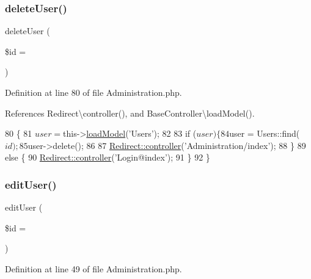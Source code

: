 \subsubsection{\texorpdfstring{delete\+User()}{deleteUser()}}
{\footnotesize\ttfamily delete\+User (\begin{DoxyParamCaption}\item[{}]{\$id = {\ttfamily \textquotesingle{}\textquotesingle{}} }\end{DoxyParamCaption})}



Definition at line 80 of file Administration.\+php.



References Redirect\textbackslash{}controller(), and Base\+Controller\textbackslash{}load\+Model().


\begin{DoxyCode}
80                                          \{
81         $user = $this->\hyperlink{class_base_controller_a5fa8890bd3a9d20f5c0cc2377dc49eb1}{loadModel}(\textcolor{stringliteral}{'Users'});
82 
83         \textcolor{keywordflow}{if} ($user) \{
84             $user = Users::find($id);
85             $user->delete();
86 
87             \hyperlink{class_redirect_ab7d0d268b6aaa9a5470b7cb8c7eb1b61}{Redirect::controller}(\textcolor{stringliteral}{'Administration/index'});
88         \}
89         \textcolor{keywordflow}{else} \{
90             \hyperlink{class_redirect_ab7d0d268b6aaa9a5470b7cb8c7eb1b61}{Redirect::controller}(\textcolor{stringliteral}{'Login@index'});
91         \}
92     \}
\end{DoxyCode}
\hypertarget{class_administration_acd3b430aeceba0ebbda62330838d0c0b}{}\label{class_administration_acd3b430aeceba0ebbda62330838d0c0b} 
\subsubsection{\texorpdfstring{edit\+User()}{editUser()}}
{\footnotesize\ttfamily edit\+User (\begin{DoxyParamCaption}\item[{}]{\$id = {\ttfamily \textquotesingle{}\textquotesingle{}} }\end{DoxyParamCaption})}



Definition at line 49 of file Administration.\+php.



